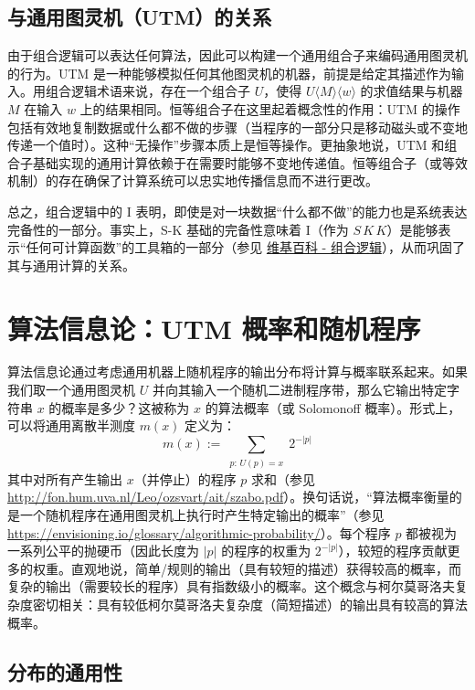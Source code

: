 \documentclass[12pt]{article}
\begin{document}
\subsection{与通用图灵机（UTM）的关系}

由于组合逻辑可以表达任何算法，因此可以构建一个通用组合子来编码通用图灵机的行为。UTM 是一种能够模拟任何其他图灵机的机器，前提是给定其描述作为输入。用组合逻辑术语来说，存在一个组合子 \( U \)，使得 \( U \langle M \rangle \langle w \rangle \) 的求值结果与机器 \( M \) 在输入 \( w \) 上的结果相同。恒等组合子在这里起着概念性的作用：UTM 的操作包括有效地复制数据或什么都不做的步骤（当程序的一部分只是移动磁头或不变地传递一个值时）。这种“无操作”步骤本质上是恒等操作。更抽象地说，UTM 和组合子基础实现的通用计算依赖于在需要时能够不变地传递值。恒等组合子（或等效机制）的存在确保了计算系统可以忠实地传播信息而不进行更改。

总之，组合逻辑中的 I 表明，即使是对一块数据“什么都不做”的能力也是系统表达完备性的一部分。事实上，S-K 基础的完备性意味着 I（作为 \( S \, K \, K \)）是能够表示“任何可计算函数”的工具箱的一部分（参见 \href{https://en.wikipedia.org/wiki/Combinatory_logic}{维基百科 - 组合逻辑}），从而巩固了其与通用计算的关系。

\section{算法信息论：UTM 概率和随机程序}

算法信息论通过考虑通用机器上随机程序的输出分布将计算与概率联系起来。如果我们取一个通用图灵机 \( U \) 并向其输入一个随机二进制程序带，那么它输出特定字符串 \( x \) 的概率是多少？这被称为 \( x \) 的算法概率（或 Solomonoff 概率）。形式上，可以将通用离散半测度 \( m(x) \) 定义为：
\[
m(x) := \sum_{\substack{p: \, U(p)=x}} 2^{-|p|}
\]
其中对所有产生输出 \( x \)（并停止）的程序 \( p \) 求和（参见 \url{http://fon.hum.uva.nl/Leo/ozsvart/ait/szabo.pdf}）。换句话说，“算法概率衡量的是一个随机程序在通用图灵机上执行时产生特定输出的概率”（参见 \url{https://envisioning.io/glossary/algorithmic-probability/}）。每个程序 \( p \) 都被视为一系列公平的抛硬币（因此长度为 \( |p| \) 的程序的权重为 \( 2^{-|p|} \)），较短的程序贡献更多的权重。直观地说，简单/规则的输出（具有较短的描述）获得较高的概率，而复杂的输出（需要较长的程序）具有指数级小的概率。这个概念与柯尔莫哥洛夫复杂度密切相关：具有较低柯尔莫哥洛夫复杂度（简短描述）的输出具有较高的算法概率。

\subsection{分布的通用性}
\end{document}
